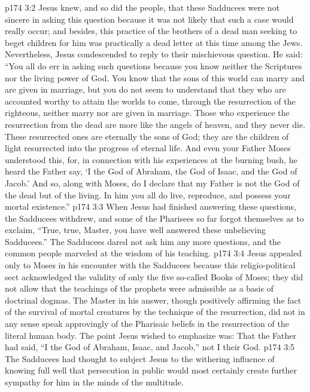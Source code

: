 \vs p174 3:2 Jesus knew, and so did the people, that these Sadducees were not sincere in asking this question because it was not likely that such a case would really occur; and besides, this practice of the brothers of a dead man seeking to beget children for him was practically a dead letter at this time among the Jews. Nevertheless, Jesus condescended to reply to their mischievous question. He said: \textcolor{ubdarkred}{“You all do err in asking such questions because you know neither the Scriptures nor the living power of God. You know that the sons of this world can marry and are given in marriage, but you do not seem to understand that they who are accounted worthy to attain the worlds to come, through the resurrection of the righteous, neither marry nor are given in marriage. Those who experience the resurrection from the dead are more like the angels of heaven, and they never die. These resurrected ones are eternally the sons of God; they are the children of light resurrected into the progress of eternal life. And even your Father Moses understood this, for, in connection with his experiences at the burning bush, he heard the Father say, ‘I  the God of Abraham, the God of Isaac, and the God of Jacob.’ And so, along with Moses, do I declare that my Father is not the God of the dead but of the living. In him you all do live, reproduce, and possess your mortal existence.”}
\vs p174 3:3 When Jesus had finished answering these questions, the Sadducees withdrew, and some of the Pharisees so far forgot themselves as to exclaim, “True, true, Master, you have well answered these unbelieving Sadducees.” The Sadducees dared not ask him any more questions, and the common people marveled at the wisdom of his teaching.
\vs p174 3:4 \pc Jesus appealed only to Moses in his encounter with the Sadducees because this religio\hyp{}political sect acknowledged the validity of only the five so\hyp{}called Books of Moses; they did not allow that the teachings of the prophets were admissible as a basis of doctrinal dogmas. The Master in his answer, though positively affirming the fact of the survival of mortal creatures by the technique of the resurrection, did not in any sense speak approvingly of the Pharisaic beliefs in the resurrection of the literal human body. The point Jesus wished to emphasize was: That the Father had said, “I  the God of Abraham, Isaac, and Jacob,” not I  their God.
\vs p174 3:5 The Sadducees had thought to subject Jesus to the withering influence of  knowing full well that persecution in public would most certainly create further sympathy for him in the minds of the multitude.
